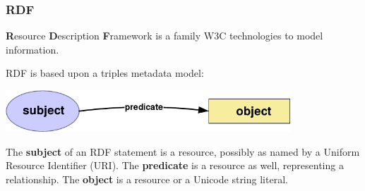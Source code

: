 \documentclass[spanish,notes=hide,16pt]{beamer}
\begin{document}
{
  \frametitle{RDF}

  \begin{Large}
     \textbf{R}esource \textbf{D}escription \textbf{F}ramework is a family W3C
     technologies to model information.
  \end{Large}

  \vspace{0.7cm}

  \begin{Large}
     RDF is based upon a triples metadata model:
     \begin{center}
       \includegraphics[width=0.8\textwidth]{images/triple.png}
     \end{center}
     The \textbf{subject} of an RDF statement is a resource, possibly as named by 
     a Uniform Resource Identifier (URI). The \textbf{predicate} is a resource as 
     well, representing a relationship. The \textbf{object} is a resource or a 
     Unicode string literal.
  \end{Large}
}
\end{document}
